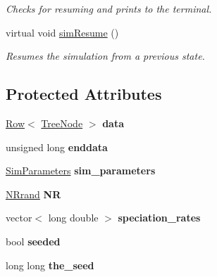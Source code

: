 \begin{DoxyCompactItemize}
\begin{DoxyCompactList}\small\item\em Checks for resuming and prints to the terminal. \end{DoxyCompactList}\item 
virtual void \hyperlink{class_tree_a3d614f3848dc7acab168642efe345569}{sim\+Resume} ()
\begin{DoxyCompactList}\small\item\em Resumes the simulation from a previous state. \end{DoxyCompactList}\end{DoxyCompactItemize}
\subsection*{Protected Attributes}
\begin{DoxyCompactItemize}
\item 
\hyperlink{class_row}{Row}$<$ \hyperlink{class_tree_node}{Tree\+Node} $>$ {\bfseries data}\hypertarget{class_tree_a5983af6c56e41be51be0766941093b4b}{}\label{class_tree_a5983af6c56e41be51be0766941093b4b}

\item 
unsigned long {\bfseries enddata}\hypertarget{class_tree_a50344999e6b64d15eef935b1f6023471}{}\label{class_tree_a50344999e6b64d15eef935b1f6023471}

\item 
\hyperlink{struct_sim_parameters}{Sim\+Parameters} {\bfseries sim\+\_\+parameters}\hypertarget{class_tree_a63c399793a209332ad0f5da7fc830d56}{}\label{class_tree_a63c399793a209332ad0f5da7fc830d56}

\item 
\hyperlink{class_n_rrand}{N\+Rrand} {\bfseries NR}\hypertarget{class_tree_aa7df162306777b040a9a2aac543e6801}{}\label{class_tree_aa7df162306777b040a9a2aac543e6801}

\item 
vector$<$ long double $>$ {\bfseries speciation\+\_\+rates}\hypertarget{class_tree_a61b4349fe78d09ac06eff4b7d6833105}{}\label{class_tree_a61b4349fe78d09ac06eff4b7d6833105}

\item 
bool {\bfseries seeded}\hypertarget{class_tree_a78935befd45946b8e69023bffca59c1d}{}\label{class_tree_a78935befd45946b8e69023bffca59c1d}

\item 
long long {\bfseries the\+\_\+seed}\hypertarget{class_tree_acf483ed0a44629c9aa4690a08017ee35}{}\label{class_tree_acf483ed0a44629c9aa4690a08017ee35}


\end{DoxyCompactItemize}
